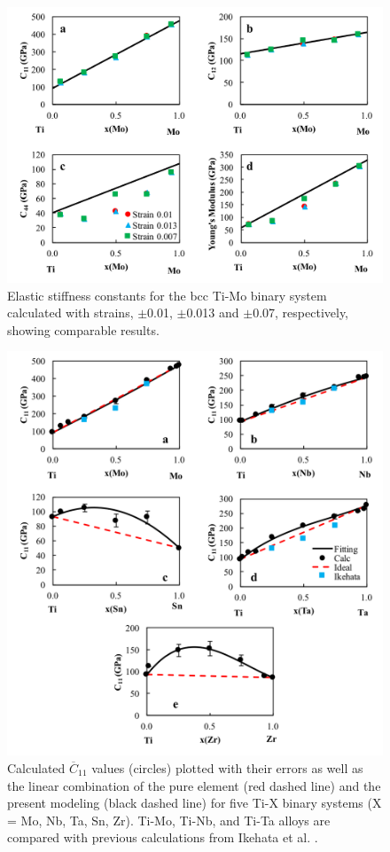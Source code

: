 \pagebreak
\begin{figure}[H]
	\centering
	\includegraphics[width=\textwidth]{Chapter-5/Figures/Strain.png}
	\caption{Elastic stiffness constants for the bcc Ti-Mo binary system calculated with strains, $\pm$0.01, $\pm$0.013 and $\pm$0.07, respectively, showing comparable results.}
	\label{Ch5-figure:Strain}
\end{figure}

\pagebreak
\begin{figure}[H]
	\centering
	\includegraphics[width=\textwidth]{Chapter-5/Figures/tixc11.png}
	\caption{Calculated $\overline{C}_{11}$ values (circles) plotted with their errors as well as the linear combination of the pure element (red dashed line) and the present modeling (black dashed line) for five Ti-X binary systems (X = Mo, Nb, Ta, Sn, Zr). Ti-Mo, Ti-Nb, and Ti-Ta alloys are compared with previous calculations from Ikehata et al. \cite{Ikehata2004}.}
	\label{Ch5-figure:tixc11}
\end{figure}

